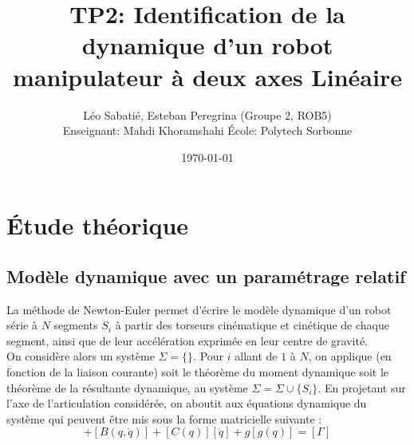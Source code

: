 \documentclass[10pt,a4paper,twocolumn]{article}
\title{\vspace{-6mm}\textbf{TP2: Identification de la dynamique d'un robot manipulateur à deux axes
Linéaire}}
\author{Léo Sabatié, Esteban Peregrina \quad (Groupe 2, ROB5) \\ 
Enseignant: Mahdi Khoramshahi \quad École: Polytech Sorbonne}
\date{\today}
\begin{document}
\maketitle
\section{Étude théorique}
\subsection{Modèle dynamique avec un paramétrage relatif}

La méthode de Newton-Euler permet d'écrire le modèle dynamique 
d'un robot série à $N$ segments $S_i$ à partir des torseurs cinématique et cinétique 
de chaque segment, ainsi que de leur accélération exprimée en leur centre de gravité. \\

On considère alors un système $\Sigma = \{\}$. Pour $i$ allant de
$1$ à $N$, on applique (en fonction de la liaison courante) soit 
le théorème du moment dynamique soit le théorème de la résultante dynamique, 
au système $\Sigma = \Sigma \cup \{S_i\}$. En projetant sur l'axe de l'articulation 
considérée, on aboutit aux équations dynamique du système qui peuvent être mis
sous la forme matricielle suivante :
\begin{equation}
  [A(q)][\ddot{q}] + [B(q,\dot{q})]+[C(q)][\dot{q}]+g[g(q)] = [\Gamma]
\label{eq:modele_general}
\end{equation}
\end{document}

